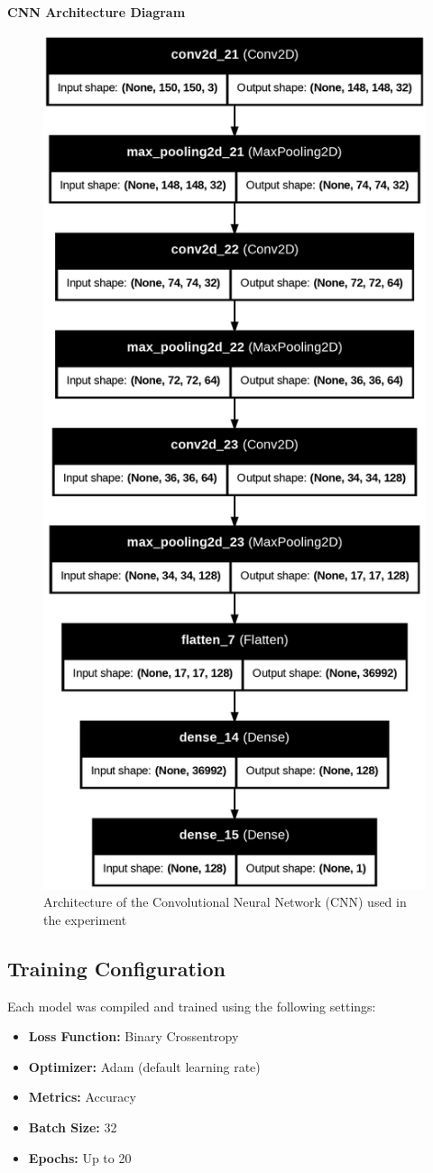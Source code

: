 \documentclass{article}
\begin{document}
\vspace{1em}
\begin{center}
    \large\textbf{CNN Architecture Diagram}
\end{center}
\vspace{0.5em}

\begin{figure}[H]
\centering
\includegraphics[width=0.5\linewidth]{cnn_diagram}
\caption{Architecture of the Convolutional Neural Network (CNN) used in the experiment}
\label{fig:cnn-architecture}
\end{figure}

\subsection{Training Configuration}
Each model was compiled and trained using the following settings:
\begin{itemize}
    \item \textbf{Loss Function:} Binary Crossentropy
    \item \textbf{Optimizer:} Adam (default learning rate)
    \item \textbf{Metrics:} Accuracy
    \item \textbf{Batch Size:} 32
    \item \textbf{Epochs:} Up to 20
\end{itemize}
\end{document}
